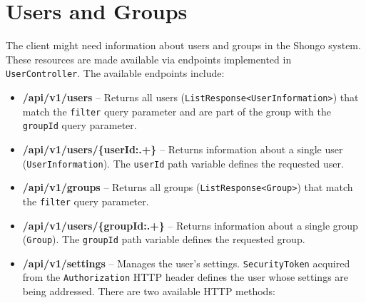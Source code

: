 \section{Users and Groups}
The client might need information about users and groups in the Shongo system.
These resources are made available via endpoints implemented in \texttt{UserController}.
The available endpoints include:
\begin{itemize}
    \item \textbf{\text{[GET]} /api/v1/users} -- Returns all users (\texttt{ListResponse<UserInformation>}) that match the \texttt{filter} query parameter and are part of the group with the \texttt{groupId} query parameter.
    \item \textbf{\text{[GET]} /api/v1/users/\{userId:.+\}} -- Returns information about a single user (\texttt{UserInformation}). The \texttt{userId} path variable defines the requested user.
    \item \textbf{\text{[GET]} /api/v1/groups} -- Returns all groups (\texttt{ListResponse<Group>}) that match the \texttt{filter} query parameter.
    \item \textbf{\text{[GET]} /api/v1/users/\{groupId:.+\}} -- Returns information about a single group (\texttt{Group}). The \texttt{groupId} path variable defines the requested group.
    \item \textbf{/api/v1/settings} -- Manages the user’s settings. \texttt{SecurityToken} acquired from the \texttt{Authorization} HTTP header defines the user whose settings are being addressed. There are two available HTTP methods:
\end{itemize}
